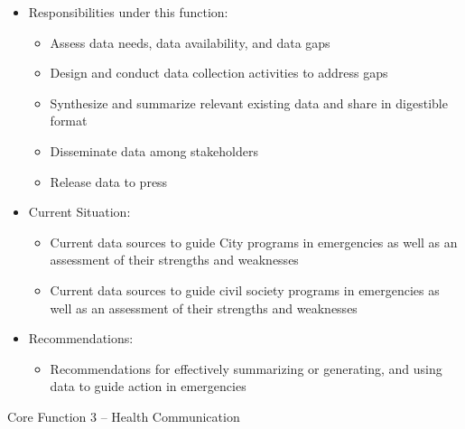 \documentclass[
  letterpaper,
  DIV=11,
  numbers=noendperiod,
  oneside]{scrreprt}
\providecommand{\tightlist}{%
  \setlength{\itemsep}{0pt}\setlength{\parskip}{0pt}}\usepackage{longtable,booktabs,array}
\begin{document}
\begin{itemize}
\item
  Responsibilities under this function:

  \begin{itemize}
  \item
    Assess data needs, data availability, and data gaps
  \item
    Design and conduct data collection activities to address gaps
  \item
    Synthesize and summarize relevant existing data and share in
    digestible format
  \item
    Disseminate data among stakeholders~
  \item
    Release data to press
  \end{itemize}
\item
  Current Situation:

  \begin{itemize}
  \item
    Current data sources to guide City programs in emergencies as well
    as an assessment of their strengths and weaknesses
  \item
    Current data sources to guide civil society programs in emergencies
    as well as an assessment of their strengths and weaknesses
  \end{itemize}
\item
  Recommendations:

  \begin{itemize}
  \tightlist
  \item
    Recommendations for effectively summarizing or generating, and using
    data to guide action in emergencies~
  \end{itemize}
\end{itemize}

\hfill\break

Core Function 3 -- Health Communication
\end{document}
